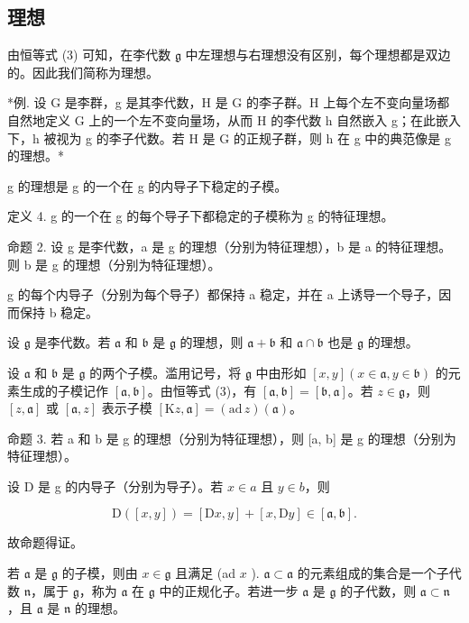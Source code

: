 \subsection{理想}

由恒等式 (3) 可知，在李代数 \(\mathfrak{g}\) 中左理想与右理想没有区别，每个理想都是双边的。因此我们简称为理想。

*例. 设 G 是李群，g 是其李代数，H 是 G 的李子群。H 上每个左不变向量场都自然地定义 G 上的一个左不变向量场，从而 H 的李代数 h 自然嵌入 g；在此嵌入下，h 被视为 g 的李子代数。若 H 是 G 的正规子群，则 h 在 g 中的典范像是 g 的理想。*

g 的理想是 g 的一个在 g 的内导子下稳定的子模。

定义 4. g 的一个在 g 的每个导子下都稳定的子模称为 g 的特征理想。

命题 2. 设 g 是李代数，a 是 g 的理想（分别为特征理想），b 是 a 的特征理想。则 b 是 g 的理想（分别为特征理想）。

g 的每个内导子（分别为每个导子）都保持 a 稳定，并在 a 上诱导一个导子，因而保持 b 稳定。

设 \(\mathfrak{g}\) 是李代数。若 \(\mathfrak{a}\) 和 \(\mathfrak{b}\) 是 \(\mathfrak{g}\) 的理想，则 \(\mathfrak{a} + \mathfrak{b}\) 和 \(\mathfrak{a} \cap \mathfrak{b}\) 也是 \(\mathfrak{g}\) 的理想。

设 \(\mathfrak{a}\) 和 \(\mathfrak{b}\) 是 \(\mathfrak{g}\) 的两个子模。滥用记号，将 \(\mathfrak{g}\) 中由形如 \([x,y](x\in\mathfrak{a},y\in\mathfrak{b})\) 的元素生成的子模记作 \([\mathfrak{a},\mathfrak{b}]\)。由恒等式 (3)，有 \([\mathfrak{a},\mathfrak{b}] = [\mathfrak{b},\mathfrak{a}]\)。若 \(z\in\mathfrak{g}\)，则 \([z,\mathfrak{a}]\) 或 \([\mathfrak{a},z]\) 表示子模 \([\mathrm{K}z,\mathfrak{a}] = (\mathrm{ad}\,z)(\mathfrak{a})\)。

命题 3. 若 a 和 b 是 g 的理想（分别为特征理想），则 {[}a, b{]} 是 g 的理想（分别为特征理想）。

设 D 是 g 的内导子（分别为导子）。若 \(x \in a\) 且 \(y \in b\)，则

\[
\mathrm{D} ([ x, y ]) = [ \mathrm{D} x, y ] + [ x, \mathrm{D} y ] \in [ \mathfrak {a}, \mathfrak {b} ].
\]

故命题得证。

若 \(\mathfrak{a}\) 是 \(\mathfrak{g}\) 的子模，则由 \(x \in \mathfrak{g}\) 且满足 (ad \(x\) ). \(\mathfrak{a} \subset \mathfrak{a}\) 的元素组成的集合是一个子代数 \(\mathfrak{n}\)，属于 \(\mathfrak{g}\)，称为 \(\mathfrak{a}\) 在 \(\mathfrak{g}\) 中的正规化子。若进一步 \(\mathfrak{a}\) 是 \(\mathfrak{g}\) 的子代数，则 \(\mathfrak{a} \subset \mathfrak{n}\)，且 \(\mathfrak{a}\) 是 \(\mathfrak{n}\) 的理想。

